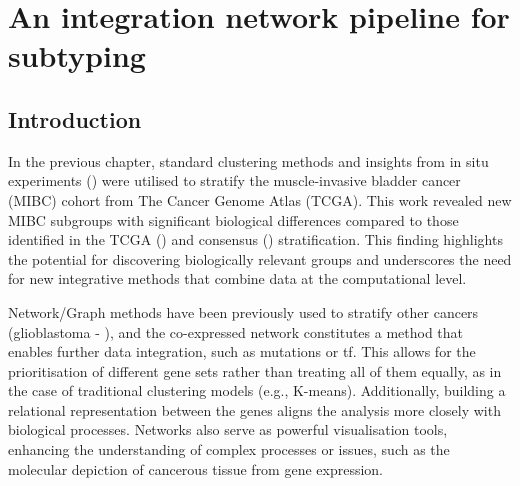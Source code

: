 \chapter{An integration network pipeline for subtyping} \label{s:N_I}


\vspace{3mm}
\vspace{3mm}


\section{Introduction}

In the previous chapter, standard clustering methods and insights from in situ experiments (\citet{Baker2022-bj}) were utilised to stratify the muscle-invasive bladder cancer (MIBC) cohort from The Cancer Genome Atlas (TCGA). This work revealed new MIBC subgroups with significant biological differences compared to those identified in the TCGA (\citet{Robertson2017-mg}) and consensus (\citet{Kamoun2020-tj}) stratification. This finding highlights the potential for discovering biologically relevant groups and underscores the need for new integrative methods that combine data at the computational level.

Network/Graph methods have been previously used to stratify other cancers (glioblastoma - \citet{Care2019-ij}), and the co-expressed network constitutes a method that enables further data integration, such as mutations or \acrfull{tf}. This allows for the prioritisation of different gene sets rather than treating all of them equally, as in the case of traditional clustering models (e.g., K-means). Additionally, building a relational representation between the genes aligns the analysis more closely with biological processes. Networks also serve as powerful visualisation tools, enhancing the understanding of complex processes or issues, such as the molecular depiction of cancerous tissue from gene expression.

